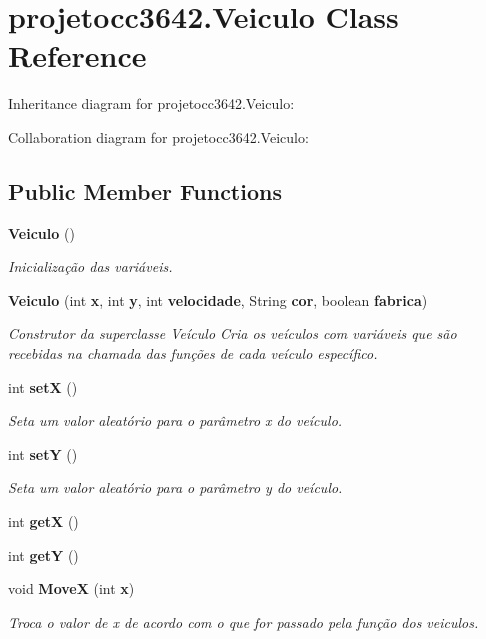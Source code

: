 \section{projetocc3642.\+Veiculo Class Reference}
\label{classprojetocc3642_1_1_veiculo}


Inheritance diagram for projetocc3642.\+Veiculo\+:


Collaboration diagram for projetocc3642.\+Veiculo\+:
\subsection*{Public Member Functions}
\begin{DoxyCompactItemize}
\item 
\textbf{ Veiculo} ()
\begin{DoxyCompactList}\small\item\em Inicialização das variáveis. \end{DoxyCompactList}\item 
\textbf{ Veiculo} (int \textbf{ x}, int \textbf{ y}, int \textbf{ velocidade}, String \textbf{ cor}, boolean \textbf{ fabrica})
\begin{DoxyCompactList}\small\item\em Construtor da superclasse Veículo Cria os veículos com variáveis que são recebidas na chamada das funções de cada veículo específico. \end{DoxyCompactList}\item 
int \textbf{ setX} ()
\begin{DoxyCompactList}\small\item\em Seta um valor aleatório para o parâmetro x do veículo. \end{DoxyCompactList}\item 
int \textbf{ setY} ()
\begin{DoxyCompactList}\small\item\em Seta um valor aleatório para o parâmetro y do veículo. \end{DoxyCompactList}\item 
int \textbf{ getX} ()
\item 
int \textbf{ getY} ()
\item 
void \textbf{ MoveX} (int \textbf{ x})
\begin{DoxyCompactList}\small\item\em Troca o valor de x de acordo com o que for passado pela função dos veiculos. \end{DoxyCompactList}\item 

\end{DoxyCompactItemize}
